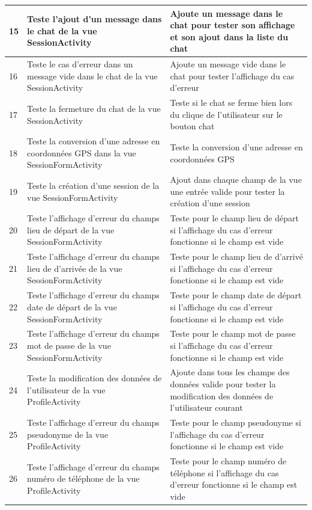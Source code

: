 \documentclass[titlepage, 12pt]{report}
\begin{document}
\begin{table}[ht]
\begin{tabularx}{\textwidth}{|X|X|X|}
\hline
15 & Teste l'ajout d'un message dans le chat de la vue SessionActivity & Ajoute un message dans le chat pour tester son affichage et son ajout dans la liste du chat \\
\hline
16 & Teste le cas d'erreur dans un message vide dans le chat de la vue SessionActivity & Ajoute un message vide dans le chat pour tester l'affichage du cas d'erreur \\
\hline
17 & Teste la fermeture du chat de la vue SessionActivity & Teste si le chat se ferme bien lors du clique de l'utilisateur sur le bouton chat \\
\hline
18 & Teste la conversion d'une adresse en coordonnées GPS dans la vue SessionFormActivity & Teste la conversion d'une adresse en coordonnées GPS \\
\hline
19 & Teste la création d'une session de la vue SessionFormActivity & Ajout dans chaque champ de la vue une entrée valide pour tester la création d'une session \\
\hline
20 & Teste l'affichage d'erreur du champs lieu de départ de la vue SessionFormActivity & Teste pour le champ lieu de départ si l'affichage du cas d'erreur fonctionne si le champ est vide \\
\hline
21 & Teste l'affichage d'erreur du champs lieu de d'arrivée de la vue SessionFormActivity & Teste pour le champ lieu de d'arrivé si l'affichage du cas d'erreur fonctionne si le champ est vide \\
\hline
22 & Teste l'affichage d'erreur du champs date de départ de la vue SessionFormActivity & Teste pour le champ date de départ si l'affichage du cas d'erreur fonctionne si le champ est vide \\
\hline
23 & Teste l'affichage d'erreur du champs mot de passe de la vue SessionFormActivity & Teste pour le champ mot de passe si l'affichage du cas d'erreur fonctionne si le champ est vide \\
\hline
24 & Teste la modification des données de l'utilisateur de la vue ProfileActivity & Ajoute dans tous les champs des données valide pour tester la modification des données de l'utilisateur courant \\
\hline
25 & Teste l'affichage d'erreur du champs pseudonyme de la vue ProfileActivity & Teste pour le champ pseudonyme si l'affichage du cas d'erreur fonctionne si le champ est vide \\
\hline
26 & Teste l'affichage d'erreur du champs numéro de téléphone de la vue ProfileActivity & Teste pour le champ numéro de téléphone si l'affichage du cas d'erreur fonctionne si le champ est vide \\
\hline \hline
\end{tabularx}
\end{table}
\end{document}
